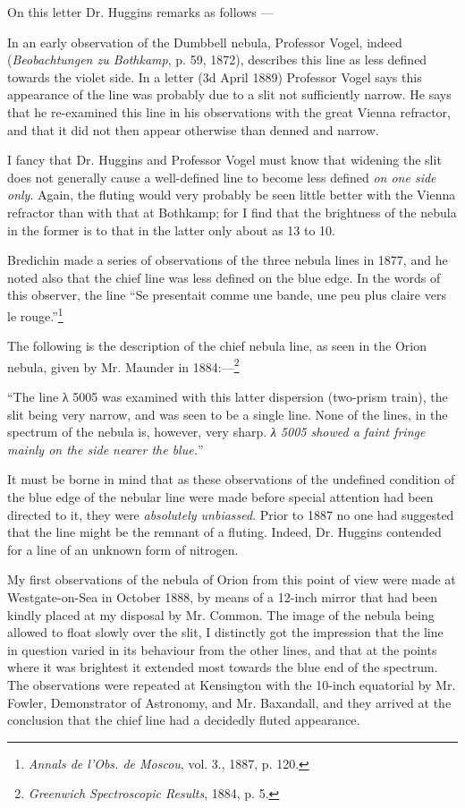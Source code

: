 \documentclass[a4paper, 12pt, oneside, polutonikogreek, english]{article}
\begin{document}
On this letter Dr. Huggins remarks as follows ---

In an early observation of the Dumbbell nebula, Professor Vogel, indeed (\emph{Beobachtungen zu Bothkamp}, p. 59, 1872), describes this line as less defined towards the violet side. In a letter (3d April 1889) Professor Vogel says this appearance of the line was probably due to a slit not sufficiently narrow. He says that he re-examined this line in his observations with the great Vienna refractor, and that it did not then appear otherwise than denned and narrow.

I fancy that Dr. Huggins and Professor Vogel must know that widening the slit does not generally cause a well-defined line to become less defined \emph{on one side only}. Again, the fluting would very probably be seen little better with the Vienna refractor than with that at Bothkamp; for I find that the brightness of the nebula in the former is to that in the latter only about as 13 to 10.

Bredichin made a series of observations of the three nebula lines in 1877, and he noted also that the chief line was less defined on the blue edge. In the words of this observer, the line ``Se presentait comme une bande, une peu plus claire vers le rouge.''\footnote{\emph{Annals de l'Obs. de Moscou}, vol. 3., 1887, p. 120.}

The following is the description of the chief nebula line, as seen in the Orion nebula, given by Mr. Maunder in 1884:---\footnote{\emph{Greenwich Spectroscopic Results}, 1884, p. 5.}

``The line λ 5005 was examined with this latter dispersion (two-prism train), the slit being very narrow, and was seen to be a single line. None of the lines, in the spectrum of the nebula is, however, very sharp. \emph{λ 5005 showed a faint fringe mainly on the side nearer the blue.}''

It must be borne in mind that as these observations of the undefined condition of the blue edge of the nebular line were made before special attention had been directed to it, they were \emph{absolutely unbiassed}. Prior to 1887 no one had suggested that the line might be the remnant of a fluting. Indeed, Dr. Huggins contended for a line of an unknown form of nitrogen.

My first observations of the nebula of Orion from this point of view were made at Westgate-on-Sea in October 1888, by means of a 12-inch mirror that had been kindly placed at my disposal by Mr. Common. The image of the nebula being allowed to float slowly over the slit, I distinctly got the impression that the line in question varied in its behaviour from the other lines, and that at the points where it was brightest it extended most towards the blue end of the spectrum. The observations were repeated at Kensington with the 10-inch equatorial by Mr. Fowler, Demonstrator of Astronomy, and Mr. Baxandall, and they arrived at the conclusion that the chief line had a decidedly fluted appearance.
\end{document}
